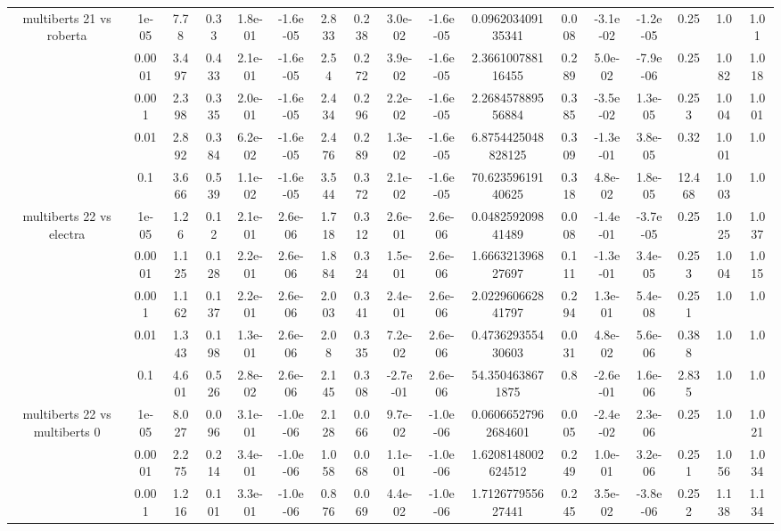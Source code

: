 \begin{tabular}{|c|c|c|c|c|c|c|c|c|c|c|c|c|c|c|c|c|}
\hline
\multirow{5}{*}{multiberts 21 vs roberta } & 1e-05 & 7.78 & 0.33 & 1.8e-01 & -1.6e-05 & 2.833 & 0.238 & 3.0e-02 & -1.6e-05 & 0.096203409135341 & 0.008 & -3.1e-02 & -1.2e-05 & 0.25 & 1.0 & 1.01 \\
 & 0.0001 & 3.497 & 0.433 & 2.1e-01 & -1.6e-05 & 2.54 & 0.272 & 3.9e-02 & -1.6e-05 & 2.366100788116455 & 0.289 & 5.0e-02 & -7.9e-06 & 0.25 & 1.082 & 1.018 \\
 & 0.001 & 2.398 & 0.335 & 2.0e-01 & -1.6e-05 & 2.434 & 0.296 & 2.2e-02 & -1.6e-05 & 2.268457889556884 & 0.385 & -3.5e-02 & 1.3e-05 & 0.253 & 1.004 & 1.001 \\
 & 0.01 & 2.892 & 0.384 & 6.2e-02 & -1.6e-05 & 2.476 & 0.289 & 1.3e-02 & -1.6e-05 & 6.8754425048828125 & 0.309 & -1.3e-01 & 3.8e-05 & 0.32 & 1.001 & 1.0 \\
 & 0.1 & 3.666 & 0.539 & 1.1e-02 & -1.6e-05 & 3.544 & 0.372 & 2.1e-02 & -1.6e-05 & 70.62359619140625 & 0.318 & 4.8e-02 & 1.8e-05 & 12.468 & 1.003 & 1.0 \\
\hline
\multirow{5}{*}{multiberts 22 vs electra } & 1e-05 & 1.26 & 0.12 & 2.1e-01 & 2.6e-06 & 1.718 & 0.312 & 2.6e-01 & 2.6e-06 & 0.048259209841489 & 0.008 & -1.4e-01 & -3.7e-05 & 0.25 & 1.025 & 1.037 \\
 & 0.0001 & 1.125 & 0.128 & 2.2e-01 & 2.6e-06 & 1.884 & 0.324 & 1.5e-01 & 2.6e-06 & 1.666321396827697 & 0.111 & -1.3e-01 & 3.4e-05 & 0.253 & 1.004 & 1.015 \\
 & 0.001 & 1.162 & 0.137 & 2.2e-01 & 2.6e-06 & 2.003 & 0.341 & 2.4e-01 & 2.6e-06 & 2.022960662841797 & 0.294 & 1.3e-01 & 5.4e-08 & 0.251 & 1.0 & 1.0 \\
 & 0.01 & 1.343 & 0.198 & 1.3e-01 & 2.6e-06 & 2.08 & 0.335 & 7.2e-02 & 2.6e-06 & 0.473629355430603 & 0.031 & 4.8e-02 & 5.6e-06 & 0.388 & 1.0 & 1.0 \\
 & 0.1 & 4.601 & 0.526 & 2.8e-02 & 2.6e-06 & 2.145 & 0.308 & -2.7e-01 & 2.6e-06 & 54.3504638671875 & 0.8 & -2.6e-01 & 1.6e-06 & 2.835 & 1.0 & 1.0 \\
\hline
\multirow{5}{*}{multiberts 22 vs multiberts 0} & 1e-05 & 8.027 & 0.096 & 3.1e-01 & -1.0e-06 & 2.128 & 0.066 & 9.7e-02 & -1.0e-06 & 0.06066527962684601 & 0.005 & -2.4e-02 & 2.3e-06 & 0.25 & 1.0 & 1.021 \\
 & 0.0001 & 2.275 & 0.214 & 3.4e-01 & -1.0e-06 & 1.058 & 0.068 & 1.1e-01 & -1.0e-06 & 1.6208148002624512 & 0.249 & 1.0e-01 & 3.2e-06 & 0.251 & 1.056 & 1.034 \\
 & 0.001 & 1.216 & 0.101 & 3.3e-01 & -1.0e-06 & 0.876 & 0.069 & 4.4e-02 & -1.0e-06 & 1.712677955627441 & 0.245 & 3.5e-02 & -3.8e-06 & 0.252 & 1.138 & 1.134 \\

\end{tabular}

